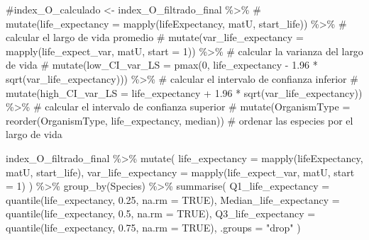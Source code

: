 \documentclass[
  12pt,
  letterpaper,
]{book}
\newenvironment{Shaded}{\begin{snugshade}}{\end{snugshade}}
\newcommand{\AttributeTok}[1]{\textcolor[rgb]{0.40,0.45,0.13}{#1}}
\newcommand{\CommentTok}[1]{\textcolor[rgb]{0.37,0.37,0.37}{#1}}
\newcommand{\ConstantTok}[1]{\textcolor[rgb]{0.56,0.35,0.01}{#1}}
\newcommand{\DecValTok}[1]{\textcolor[rgb]{0.68,0.00,0.00}{#1}}
\newcommand{\FloatTok}[1]{\textcolor[rgb]{0.68,0.00,0.00}{#1}}
\newcommand{\FunctionTok}[1]{\textcolor[rgb]{0.28,0.35,0.67}{#1}}
\newcommand{\NormalTok}[1]{\textcolor[rgb]{0.00,0.23,0.31}{#1}}
\newcommand{\SpecialCharTok}[1]{\textcolor[rgb]{0.37,0.37,0.37}{#1}}
\newcommand{\StringTok}[1]{\textcolor[rgb]{0.13,0.47,0.30}{#1}}
\begin{document}
\begin{Shaded}
\begin{Highlighting}[]
\CommentTok{\#index\_O\_calculado \textless{}{-} index\_O\_filtrado\_final \%\textgreater{}\%}
\CommentTok{\#  mutate(life\_expectancy = mapply(lifeExpectancy, matU, start\_life)) \%\textgreater{}\% \# calcular el largo de vida promedio}
\CommentTok{\#  mutate(var\_life\_expectancy = mapply(life\_expect\_var, matU, start = 1)) \%\textgreater{}\% \# calcular la varianza del largo de vida}
\CommentTok{\#  mutate(low\_CI\_var\_LS = pmax(0, life\_expectancy {-} 1.96 * sqrt(var\_life\_expectancy))) \%\textgreater{}\% \# calcular el intervalo de confianza inferior}
\CommentTok{\#  mutate(high\_CI\_var\_LS = life\_expectancy + 1.96 * sqrt(var\_life\_expectancy)) \%\textgreater{}\% \# calcular el intervalo de confianza superior}
\CommentTok{\#  mutate(OrganismType = reorder(OrganismType, life\_expectancy, median)) \# ordenar las especies por el largo de vida }




\NormalTok{index\_O\_filtrado\_final }\SpecialCharTok{\%\textgreater{}\%}
  \FunctionTok{mutate}\NormalTok{(}
    \AttributeTok{life\_expectancy =} \FunctionTok{mapply}\NormalTok{(lifeExpectancy, matU, start\_life),}
    \AttributeTok{var\_life\_expectancy =} \FunctionTok{mapply}\NormalTok{(life\_expect\_var, matU, }\AttributeTok{start =} \DecValTok{1}\NormalTok{)}
\NormalTok{  ) }\SpecialCharTok{\%\textgreater{}\%}
  \FunctionTok{group\_by}\NormalTok{(Species) }\SpecialCharTok{\%\textgreater{}\%}
  \FunctionTok{summarise}\NormalTok{(}
    \AttributeTok{Q1\_life\_expectancy =} \FunctionTok{quantile}\NormalTok{(life\_expectancy, }\FloatTok{0.25}\NormalTok{, }\AttributeTok{na.rm =} \ConstantTok{TRUE}\NormalTok{),}
    \AttributeTok{Median\_life\_expectancy =} \FunctionTok{quantile}\NormalTok{(life\_expectancy, }\FloatTok{0.5}\NormalTok{, }\AttributeTok{na.rm =} \ConstantTok{TRUE}\NormalTok{),}
    \AttributeTok{Q3\_life\_expectancy =} \FunctionTok{quantile}\NormalTok{(life\_expectancy, }\FloatTok{0.75}\NormalTok{, }\AttributeTok{na.rm =} \ConstantTok{TRUE}\NormalTok{),}
    \AttributeTok{.groups =} \StringTok{"drop"}
\NormalTok{  )}







\end{Highlighting}
\end{Shaded}
\end{document}
